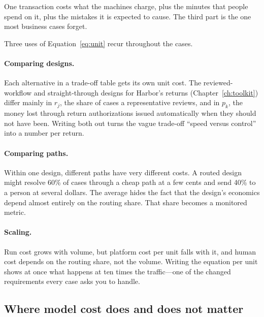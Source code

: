 \begin{keyidea}
One transaction costs what the machines charge, plus the minutes that people spend on it, plus the mistakes it is expected to cause. The third part is the one most business cases forget.
\end{keyidea}

Three uses of Equation~\eqref{eq:unit} recur throughout the cases.

\paragraph{Comparing designs.} Each alternative in a trade-off table gets its own unit cost. The reviewed-workflow and straight-through designs for Harbor's returns (Chapter~\ref{ch:toolkit}) differ mainly in $r_j$, the share of cases a representative reviews, and in $p_k$, the money lost through return authorizations issued automatically when they should not have been. Writing both out turns the vague trade-off ``speed versus control'' into a number per return.

\paragraph{Comparing paths.} Within one design, different paths have very different costs. A routed design might resolve 60\% of cases through a cheap path at a few cents and send 40\% to a person at several dollars. The average hides the fact that the design's economics depend almost entirely on the routing share. That share becomes a monitored metric.

\paragraph{Scaling.} Run cost grows with volume, but platform cost per unit falls with it, and human cost depends on the routing share, not the volume. Writing the equation per unit shows at once what happens at ten times the traffic---one of the changed requirements every case asks you to handle.

\subsection{Where model cost does and does not matter}

